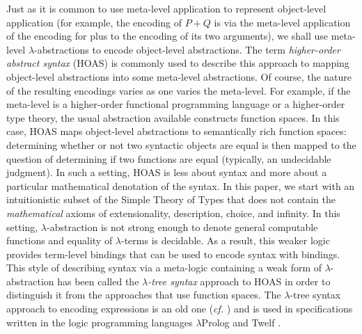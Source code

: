 \documentclass{acmtrans2m}
\begin{document}
Just as it is common to use meta-level application to represent
object-level application (for example, the encoding of $P+Q$ is via
the meta-level application of the encoding for plus to the encoding of
its two arguments), we shall use meta-level $\lambda$-abstractions to
encode object-level abstractions.  The term {\em higher-order abstract
  syntax} (HOAS) \cite{pfenning88pldi} is commonly used to describe
this approach to mapping object-level abstractions into some
meta-level abstractions.  Of course, the nature of the resulting
encodings varies as one varies the meta-level.  For example, if the
meta-level is a higher-order functional programming language or a
higher-order type theory, the usual abstraction available constructs
function spaces.  In this case, HOAS maps object-level abstractions to
semantically rich function spaces: determining whether or not two
syntactic objects are equal is then mapped to the question of
determining if two functions are equal (typically, an undecidable
judgment).  In such a setting, HOAS is less about syntax and more
about a particular mathematical denotation of the syntax.  In this
paper, we start with an intuitionistic subset of the Simple Theory of
Types \cite{church40} that does not contain the {\em mathematical}
axioms of extensionality, description, choice, and infinity.  In this
setting, $\lambda$-abstraction is not strong enough to denote general
computable functions and equality of $\lambda$-terms is decidable.  As
a result, this weaker logic provides term-level bindings that can be
used to encode syntax with bindings.  This style of describing syntax
via a meta-logic containing a weak form of $\lambda$-abstraction has
been called the {\em $\lambda$-tree syntax} \cite{miller00cl} approach
to HOAS in order to distinguish it from the approaches that use
function spaces.  The $\lambda$-tree syntax approach to encoding
expressions is an old one ({\em cf.}
\cite{huet78,miller86acl,miller87slp,paulson86jlp}) and is used in
specifications written in the logic programming languages
$\lambda$Prolog \cite{nadathur88iclp} and Twelf \cite{pfenning99cade}.
\end{document}
